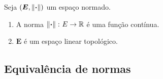 \begin{proposition}
Seja $(\bm E,\left\Vert{\bm{\cdot}}\right\Vert)$ um espaço normado.
	\begin{enumerate}
	\item A norma $\left\Vert{\bm{\cdot}}\right\Vert\colon E \to \mathbb{R}$ é uma função contínua.
	\item $\bm E$ é um espaço linear topológico.
	\end{enumerate}
\end{proposition}
%

\subsection{Equivalência de normas}




